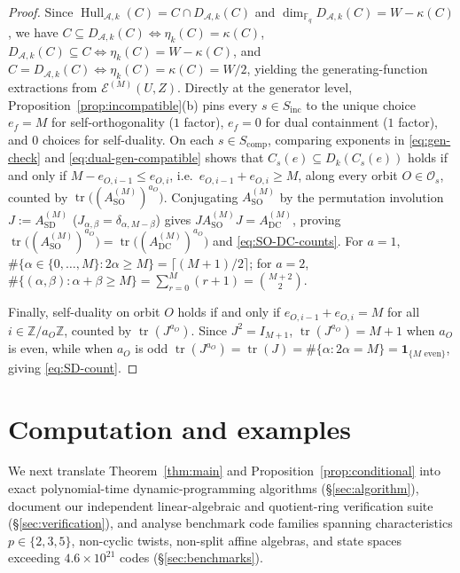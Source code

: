 \documentclass[preprint,12pt]{elsarticle}
\newcommand{\F}{\mathbb F}
\newcommand{\Z}{\mathbb Z}
\newcommand{\A}{\mathcal A}
\newcommand{\Os}{\mathcal O_s}
\newcommand{\Epoly}{\mathscr E}
\newcommand{\Hull}{\operatorname{Hull}}
\newcommand{\tr}{\operatorname{tr}}
\newcommand{\Dk}{D_k}
\numberwithin{equation}{section}
\theoremstyle{plain}
\theoremstyle{definition}
\theoremstyle{remark}
\begin{document}
\begin{proof}
Since $\Hull_{\A,k}(C)=C\cap D_{\A,k}(C)$ and $\dim_{\F_q}D_{\A,k}(C)=W-\kappa(C)$,
we have $C\subseteq D_{\A,k}(C)\iff\eta_k(C)=\kappa(C)$,
$D_{\A,k}(C)\subseteq C\iff\eta_k(C)=W-\kappa(C)$, and
$C=D_{\A,k}(C)\iff\eta_k(C)=\kappa(C)=W/2$, yielding the generating-function
extractions from $\Epoly^{(M)}(U,Z)$. Directly at the generator level,
Proposition~\ref{prop:incompatible}\textup{(b)} pins every $s\in S_{\mathrm{inc}}$
to the unique choice $e_f=M$ for self-orthogonality ($1$ factor), $e_f=0$ for
dual containment ($1$ factor), and $0$ choices for self-duality. On each
$s\in S_{\mathrm{comp}}$, comparing exponents in \eqref{eq:gen-check} and
\eqref{eq:dual-gen-compatible} shows that $C_s(e)\subseteq\Dk(C_s(e))$ holds if
and only if $M-e_{O,i-1}\le e_{O,i}$, i.e.\ $e_{O,i-1}+e_{O,i}\ge M$, along every
orbit $O\in\Os$, counted by $\tr\bigl((A_{\mathrm{SO}}^{(M)})^{a_O}\bigr)$.
Conjugating $A_{\mathrm{SO}}^{(M)}$ by the permutation involution
$J:=A_{\mathrm{SD}}^{(M)}$ ($J_{\alpha,\beta}=\delta_{\alpha,M-\beta}$) gives
$J A_{\mathrm{SO}}^{(M)} J=A_{\mathrm{DC}}^{(M)}$, proving
$\tr\bigl((A_{\mathrm{SO}}^{(M)})^{a_O}\bigr)=\tr\bigl((A_{\mathrm{DC}}^{(M)})^{a_O}\bigr)$
and \eqref{eq:SO-DC-counts}. For $a=1$, $\#\{\alpha\in\{0,\dots,M\}:2\alpha\ge M\}
=\lceil(M+1)/2\rceil$; for $a=2$, $\#\{(\alpha,\beta):\alpha+\beta\ge M\}
=\sum_{r=0}^{M}(r+1)=\binom{M+2}{2}$.

Finally, self-duality on orbit $O$ holds if and only if $e_{O,i-1}+e_{O,i}=M$ for
all $i\in\Z/a_O\Z$, counted by $\tr(J^{a_O})$. Since $J^2=I_{M+1}$, $\tr(J^{a_O})=M+1$
when $a_O$ is even, while when $a_O$ is odd $\tr(J^{a_O})=\tr(J)
=\#\{\alpha:2\alpha=M\}=\mathbf 1_{\{M\text{ even}\}}$, giving \eqref{eq:SD-count}.
\end{proof}

\section{Computation and examples}\label{sec:examples}

We next translate Theorem~\ref{thm:main} and Proposition~\ref{prop:conditional}
into exact polynomial-time dynamic-programming algorithms (\S\ref{sec:algorithm}),
document our independent linear-algebraic and quotient-ring verification suite
(\S\ref{sec:verification}), and analyse benchmark code families spanning
characteristics $p\in\{2,3,5\}$, non-cyclic twists, non-split affine algebras,
and state spaces exceeding $4.6\times 10^{21}$ codes (\S\ref{sec:benchmarks}).
\end{document}
